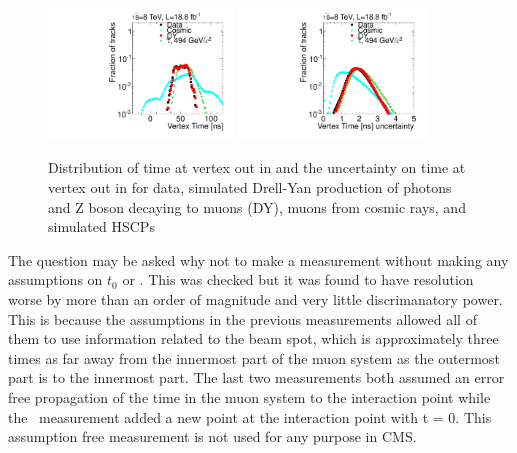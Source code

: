 \begin{figure}
  \begin{center}
      \includegraphics[width=0.44\textwidth]{figures/timing/VertexOpp}
      \includegraphics[width=0.44\textwidth]{figures/timing/VertexOppErr} \\
      \caption[Distribution of time at vertex out in and the uncertainty on time at vertex out in]
     {Distribution of time at vertex out in and the uncertainty on time at vertex out in for data,
simulated Drell-Yan production of photons and Z boson decaying to muons (DY), muons from cosmic rays, and simulated HSCPs
}
      \label{fig:vertexopptime}
  \end{center}
\end{figure}

The question may be asked why not to make a measurement without making any assumptions on $t_0$ or \invbeta. This was checked but it was found to have
resolution worse by more than an order of magnitude and very little discrimanatory power.
This is because the assumptions in the previous measurements allowed all of them to use information
related to the beam spot, which is approximately three times as far away from the innermost part of the muon system as the outermost part is to the innermost part.
The last two measurements both assumed an error free propagation of the time in the muon system to the interaction point while the \invbeta\ measurement
added a new point at the interaction point with t = 0. This assumption free measurement is not used for any purpose in CMS.


